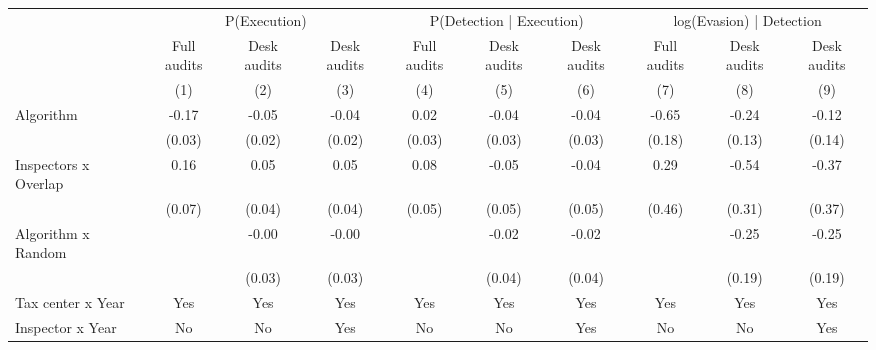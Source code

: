 \begin{tabular}{lccc|ccc|ccc} \toprule
\multicolumn{1}{l}{} & \multicolumn{3}{c}{P(Execution)} & \multicolumn{3}{c}{P(Detection | Execution)} & \multicolumn{3}{c}{log(Evasion) | Detection} \\\cmidrule(lr){2-4}\cmidrule(lr){5-7}\cmidrule(lr){8-10} \multicolumn{1}{l}{} & Full audits & Desk audits & Desk audits & Full audits & Desk audits & Desk audits & Full audits & Desk audits & Desk audits \\ \multicolumn{1}{l}{} & (1) & (2) & (3) & (4) & (5) & (6) & (7) & (8) & (9) \\ \midrule
Algorithm   &       -0.17\sym{***}&       -0.05\sym{**} &       -0.04\sym{**} &        0.02         &       -0.04         &       -0.04         &       -0.65\sym{***}&       -0.24\sym{*}  &       -0.12         \\
            &      (0.03)         &      (0.02)         &      (0.02)         &      (0.03)         &      (0.03)         &      (0.03)         &      (0.18)         &      (0.13)         &      (0.14)         \\
\addlinespace
Inspectors x Overlap&        0.16\sym{**} &        0.05         &        0.05         &        0.08         &       -0.05         &       -0.04         &        0.29         &       -0.54\sym{*}  &       -0.37         \\
            &      (0.07)         &      (0.04)         &      (0.04)         &      (0.05)         &      (0.05)         &      (0.05)         &      (0.46)         &      (0.31)         &      (0.37)         \\
\addlinespace
Algorithm x Random&                     &       -0.00         &       -0.00         &                     &       -0.02         &       -0.02         &                     &       -0.25         &       -0.25         \\
            &                     &      (0.03)         &      (0.03)         &                     &      (0.04)         &      (0.04)         &                     &      (0.19)         &      (0.19)         \\
\midrule
Tax center x Year&         Yes         &         Yes         &         Yes         &         Yes         &         Yes         &         Yes         &         Yes         &         Yes         &         Yes         \\
Inspector x Year&          No         &          No         &         Yes         &          No         &          No         &         Yes         &          No         &          No         &         Yes         \\

\end{tabular}

